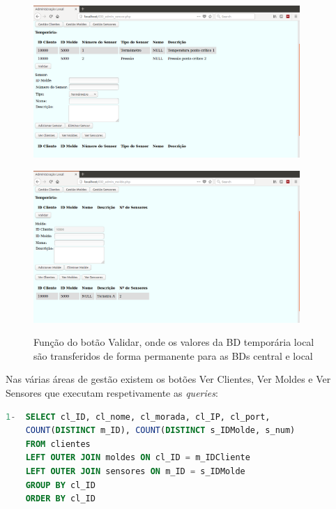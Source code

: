 \documentclass[11pt,twoside,a4paper]{report}
\begin{document}
\begin{figure}
	\centering
	\begin{minipage}{1\textwidth}
		\begin{center}
			\includegraphics[width=0.9\textwidth]{administracao07} %
			\label{fig:admin12}
		\end{center}
	\end{minipage}
	\begin{minipage}{1\textwidth}
		\begin{center}
			\includegraphics[width=0.9\textwidth]{administracao08} %
			\label{fig:admin13}
		\end{center}
	\end{minipage}
	\caption[Função do botão Validar]{Função do botão Validar, onde os valores da BD temporária local são transferidos de forma permanente para as BDs central e local}
	\label{fig:admin11}
\end{figure}
Nas várias áreas de gestão existem os botões Ver Clientes, Ver Moldes e Ver Sensores que executam respetivamente as \textit{queries}:
\begin{lstlisting}[language = SQL]
1-	SELECT cl_ID, cl_nome, cl_morada, cl_IP, cl_port,
	COUNT(DISTINCT m_ID), COUNT(DISTINCT s_IDMolde, s_num)
	FROM clientes
	LEFT OUTER JOIN moldes ON cl_ID = m_IDCliente
	LEFT OUTER JOIN sensores ON m_ID = s_IDMolde
	GROUP BY cl_ID
	ORDER BY cl_ID
\end{lstlisting}
\end{document}
